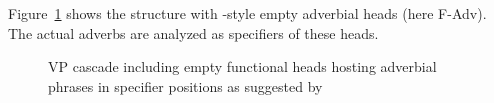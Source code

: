 Figure~\ref{fig-Cinque-AdvP-VP-selection} shows the structure with \citeauthor{Cinque99a-u}-style
empty adverbial heads (here F-Adv). The actual adverbs are analyzed as specifiers of these heads.
\begin{figure}
\caption{VP cascade including empty functional heads hosting adverbial phrases in specifier positions
  as suggested by \citet{Cinque99a-u}}\label{fig-Cinque-AdvP-VP-selection}
\end{figure}

